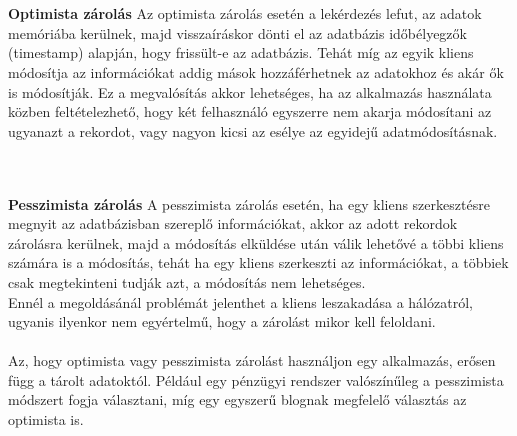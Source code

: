 \hfill\\\\
\textbf{Optimista zárolás}
Az optimista zárolás esetén a lekérdezés lefut, az adatok memóriába kerülnek, majd visszaíráskor dönti el az adatbázis időbélyegzők (timestamp) alapján, hogy frissült-e az adatbázis. Tehát míg az egyik kliens módosítja az információkat addig mások hozzáférhetnek az adatokhoz és akár ők is módosítják. Ez a megvalósítás akkor lehetséges, ha az alkalmazás használata közben feltételezhető, hogy két felhasználó egyszerre nem akarja módosítani az ugyanazt a rekordot, vagy nagyon kicsi az esélye az egyidejű adatmódosításnak.

\hfill\\\\
\textbf{Pesszimista zárolás}
A pesszimista zárolás esetén, ha egy kliens szerkesztésre megnyit az adatbázisban szereplő információkat, akkor az adott rekordok zárolásra kerülnek, majd a módosítás elküldése után válik lehetővé a többi kliens számára is a módosítás, tehát ha egy kliens szerkeszti az információkat, a többiek csak megtekinteni tudják azt, a módosítás nem lehetséges.\\
Ennél a megoldásánál problémát jelenthet a kliens leszakadása a hálózatról, ugyanis ilyenkor nem egyértelmű, hogy a zárolást mikor kell feloldani.\\
\hfill\\
Az, hogy optimista vagy pesszimista zárolást használjon egy alkalmazás, erősen függ a tárolt adatoktól. Például egy pénzügyi rendszer valószínűleg a pesszimista módszert fogja választani, míg egy egyszerű blognak megfelelő választás az optimista is.



